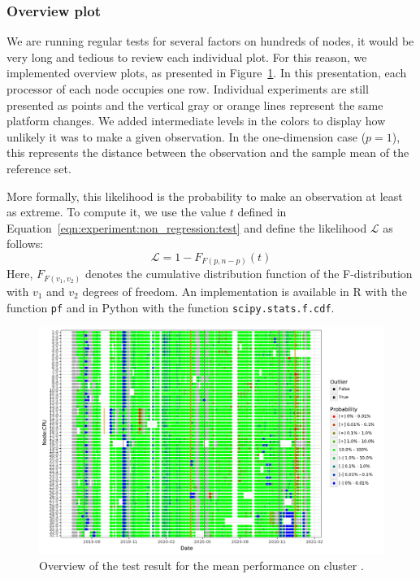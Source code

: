             \subsubsection{Overview plot}%

                We are running regular tests for several factors on hundreds of nodes, it would be very long and tedious
                to review each individual plot. For this reason, we implemented overview plots, as presented in
                Figure~\ref{fig:experiment:non_regression:overview}. In this presentation, each processor of each node
                occupies one row. Individual experiments are still presented as points and the vertical gray or orange
                lines represent the same platform changes. We added intermediate levels in the colors to display how
                unlikely it was to make a given observation. In the one-dimension case (\ie \(p=1\)), this represents
                the distance between the observation and the sample mean of the reference set.

                More formally, this likelihood is the probability to make an observation at least as extreme. To compute
                it, we use the value \(t\) defined in Equation~\ref{eqn:experiment:non_regression:test} and define the
                likelihood \(\mathcal{L}\) as follows:
                \begin{equation}\label{eqn:experiment:non_regression:likelihood}
                    \mathcal{L} = 1-F_{F(p, n-p)}(t)
                \end{equation}
                Here, \(F_{F(v_1, v_2)}\) denotes the cumulative distribution function of the F-distribution with
                \(v_1\) and \(v_2\) degrees of freedom. An implementation is available in R with the function
                \texttt{pf} and in Python with the function
                \texttt{scipy.stats.f.cdf}.

                \begin{figure}[htpb]
                    \centering
                    \includegraphics[width=\linewidth]{img/experiment/non_regression/implementation/overview.pdf}
                    \caption{Overview of the test result for the mean performance on cluster \dahu.}%
                    \label{fig:experiment:non_regression:overview}
                \end{figure}

